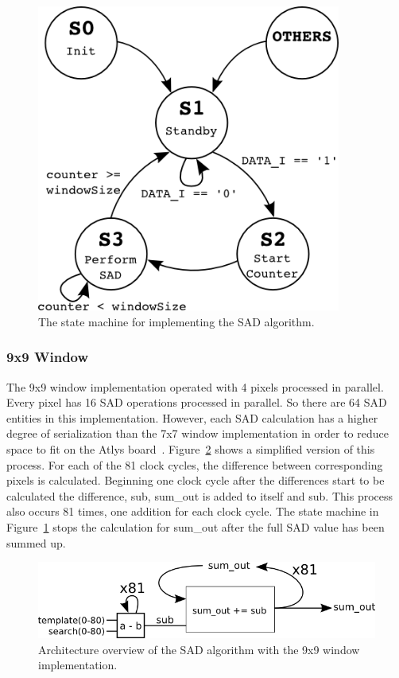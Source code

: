 \begin{figure}
	\begin{center}
		\includegraphics[width=100mm]{figures/stateMachine.png}
		\captionfonts
		\caption{The state machine for implementing the SAD algorithm.}
		\label{fig:stateMachine}
	\end{center}
\end{figure}

\subsubsection{9x9 Window}
\label{sec:9x9window}

The 9x9 window implementation operated with 4 pixels processed in parallel. Every pixel has 16 SAD operations processed in parallel. So there are 64 SAD entities in this implementation. However, each SAD calculation has a higher degree of serialization than the 7x7 window implementation in order to reduce space to fit on the Atlys board~\cite{atlysBoard}. Figure~\ref{fig:sadAlg9x9} shows a simplified version of this process. For each of the 81 clock cycles, the difference between corresponding pixels is calculated. Beginning one clock cycle after the differences start to be calculated the difference, sub, sum\_out is added to itself and sub. This process also occurs 81 times, one addition for each clock cycle. The state machine in Figure~\ref{fig:stateMachine} stops the calculation for sum\_out after the full SAD value has been summed up.

\begin{figure}
	\begin{center}
		\includegraphics[width=120mm]{figures/sadAlgorithm9x9.png}
		\captionfonts
		\caption{Architecture overview of the SAD algorithm with the 9x9 window implementation.}
		\label{fig:sadAlg9x9}
	\end{center}
\end{figure}

